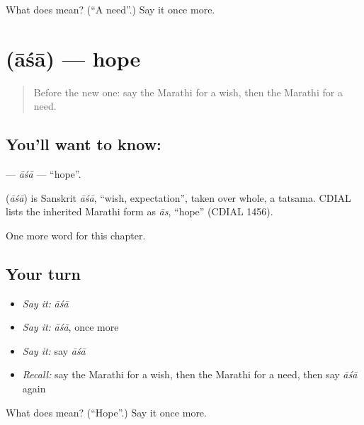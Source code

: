 \begin{tcolorbox}[breakable,colback=teal!4,colframe=teal!35!black,title={Before you move on}]
What does  mean? (\textquotedblleft{}A need\textquotedblright{}.) Say it once more.
\end{tcolorbox}
\section[\texorpdfstring{\mr{आशा} (āśā)}{आशा (āśā)}]{ (āśā) — hope}

\label{lesson:MR-C123-asa}



\begin{quote}
Before the new one: say the Marathi for a wish, then the Marathi for a need.
\end{quote}

\subsection*{You'll want to know: }
\textbf{} — \emph{āśā} — \textquotedblleft{}hope\textquotedblright{}.

\begin{cousinweb}
\textbf{} (\emph{āśā}) is Sanskrit \emph{āśā}, \textquotedblleft{}wish, expectation\textquotedblright{}, taken over whole, a tatsama. CDIAL lists the inherited Marathi form as \emph{ās}, \textquotedblleft{}hope\textquotedblright{} (CDIAL 1456).
\end{cousinweb}

\begin{grammarlens}[title={What you've built}]
One more word for this chapter.
\end{grammarlens}

\subsection*{Your turn}
\begin{itemize}
\raggedright
  \item \emph{Say it:} \emph{āśā}
  \item \emph{Say it:} \emph{āśā}, once more
  \item \emph{Say it:} say \emph{āśā}
  \item \emph{Recall:} say the Marathi for a wish, then the Marathi for a need, then say \emph{āśā} again
\end{itemize}

\begin{tcolorbox}[breakable,colback=teal!4,colframe=teal!35!black,title={Before you move on}]
What does  mean? (\textquotedblleft{}Hope\textquotedblright{}.) Say it once more.
\end{tcolorbox}
